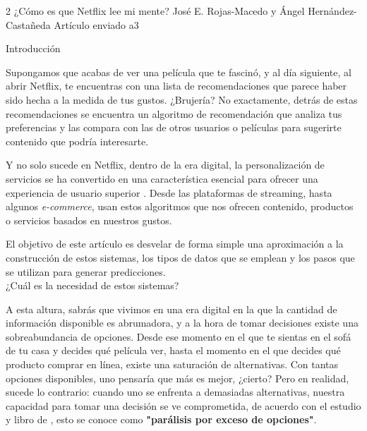 \documentclass[letterpaper,10pt,final,hyphenatedtitles]{papertexKS}
\author{}
\title{}
\begin{document}
\newpage




\begin{news}{2}
	{¿Cómo es que Netflix lee mi mente?}
	{\textcolor{color}{José E. Rojas-Macedo} y \textcolor{color}{Ángel Hernández-Castañeda}}
	{Artículo enviado}
	{a3}

	\noindent\textcolor{color}{\Large{Introducción}}

	Supongamos que acabas de ver una película que te fascinó, y al día siguiente, al abrir Netflix, te encuentras con una lista de recomendaciones que parece haber sido hecha a la medida de tus gustos. ¿Brujería? No exactamente, detrás de estas recomendaciones se encuentra un algoritmo de recomendación que analiza tus preferencias y las compara con las de otros usuarios o películas para sugerirte contenido que podría interesarte.
	
	Y no solo sucede en Netflix, dentro de la era digital, la personalización de servicios se ha convertido en una característica esencial para ofrecer una experiencia de usuario superior \cite{Deloitte2024}. Desde las plataformas de streaming, hasta algunos \textit{e-commerce}, usan estos algoritmos que nos ofrecen contenido, productos o servicios basados en nuestros gustos.

	El objetivo de este artículo es desvelar de forma simple una aproximación a la construcción de estos sistemas, los tipos de datos que se emplean y los pasos que se utilizan para generar predicciones.
	\\

	\noindent\textcolor{color}{\Large{¿Cuál es la necesidad de estos sistemas?}}

	A esta altura, sabrás que vivimos en una era digital en la que la cantidad de información disponible es abrumadora, y a la hora de tomar decisiones existe una sobreabundancia de opciones. Desde ese momento en el que te sientas en el sofá de tu casa y decides qué película ver, hasta el momento en el que decides qué producto comprar en línea, existe una saturación de alternativas. Con tantas opciones disponibles, uno pensaría que más es mejor, ¿cierto? Pero en realidad, sucede lo contrario: cuando uno se enfrenta a demasiadas alternativas, nuestra capacidad para tomar una decisión se ve comprometida, de acuerdo con el estudio y libro de \cite{schwartz2005qué}, esto se conoce como \textbf{"parálisis por exceso de opciones"}.


\end{news}
\end{document}
